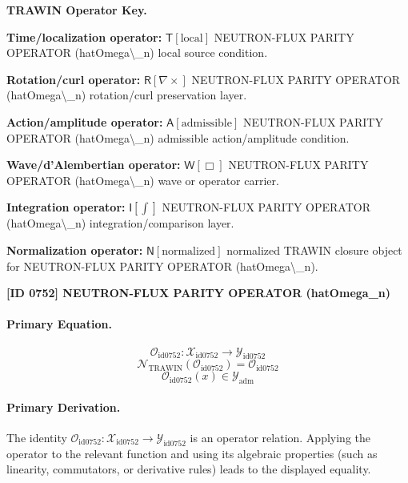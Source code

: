 \par\vspace{0.45\baselineskip}
\noindent\begin{minipage}[t]{\linewidth}
\begingroup
\small
\raggedright
\textbf{TRAWIN Operator Key.}\par
\noindent\textbf{Time/localization operator:} $\mathsf{T}\!\left[\mathrm{local}\right]$ NEUTRON-FLUX PARITY OPERATOR (hatOmega\textbackslash{}\_n) local source condition.\par
\noindent\textbf{Rotation/curl operator:} $\mathsf{R}\!\left[\nabla\times\right]$ NEUTRON-FLUX PARITY OPERATOR (hatOmega\textbackslash{}\_n) rotation/curl preservation layer.\par
\noindent\textbf{Action/amplitude operator:} $\mathsf{A}\!\left[\mathrm{admissible}\right]$ NEUTRON-FLUX PARITY OPERATOR (hatOmega\textbackslash{}\_n) admissible action/amplitude condition.\par
\noindent\textbf{Wave/d'Alembertian operator:} $\mathsf{W}\!\left[\Box\right]$ NEUTRON-FLUX PARITY OPERATOR (hatOmega\textbackslash{}\_n) wave or operator carrier.\par
\noindent\textbf{Integration operator:} $\mathsf{I}\!\left[\int\right]$ NEUTRON-FLUX PARITY OPERATOR (hatOmega\textbackslash{}\_n) integration/comparison layer.\par
\noindent\textbf{Normalization operator:} $\mathsf{N}\!\left[\mathrm{normalized}\right]$ normalized TRAWIN closure object for NEUTRON-FLUX PARITY OPERATOR (hatOmega\textbackslash{}\_n).\par
\endgroup
\end{minipage}

\clearpage
\noindent\textbf{[ID 0752] NEUTRON-FLUX PARITY OPERATOR (hatOmega\_n)}\par
\vspace{0.35em}
\paragraph{Primary Equation.}
\[
\mathcal{O}_{\mathrm{id0752}}:\mathcal{X}_{\mathrm{id0752}}\longrightarrow\mathcal{Y}_{\mathrm{id0752}}
\]
\[
\mathcal{N}_{\mathrm{TRAWIN}}(\mathcal{O}_{\mathrm{id0752}})=\mathcal{O}_{\mathrm{id0752}}
\]
\[
\mathcal{O}_{\mathrm{id0752}}(x)\in\mathcal{Y}_{\mathrm{adm}}
\]

\paragraph{Primary Derivation.}
The identity \( \mathcal{O}_{\mathrm{id0752}}:\mathcal{X}_{\mathrm{id0752}}\longrightarrow\mathcal{Y}_{\mathrm{id0752}} \) is an operator relation. Applying the operator to the relevant function and using its algebraic properties (such as linearity, commutators, or derivative rules) leads to the displayed equality.
